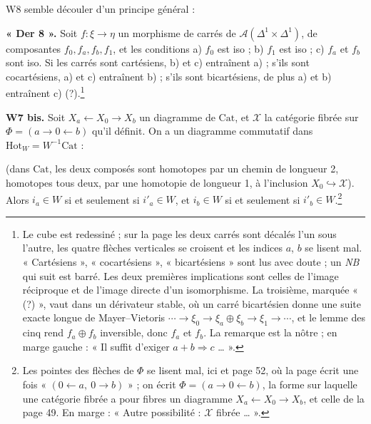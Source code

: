 \documentclass[11pt,a4paper]{article}
\begin{document}
W8 semble découler d'un principe général :

\textbf{« Der 8 ».} Soit $f : \xi \to \eta$ un morphisme de carrés de
$\mathcal{A}(\Delta^1 \times \Delta^1)$, de composantes $f_0, f_a, f_b,
f_1$, et les conditions a) $f_0$ est iso ; b) $f_1$ est iso ; c) $f_a$ et
$f_b$ sont iso. Si les carrés sont cartésiens, b) et c) entraînent a) ; s'ils
sont cocartésiens, a) et c) entraînent b) ; s'ils sont bicartésiens, de plus a)
et b) entraînent c) (?).\footnote{Le cube est redessiné ; sur la page les deux carrés sont décalés
l'un sous l'autre, les quatre flèches verticales se croisent et les indices
$a$, $b$ se lisent mal. « Cartésiens », « cocartésiens », « bicartésiens »
sont lus avec doute ; un \emph{NB} qui suit est barré. Les deux premières
implications sont celles de l'image réciproque et de l'image directe d'un
isomorphisme. La troisième, marquée « (?) », vaut dans un dérivateur stable,
où un carré bicartésien donne une suite exacte longue de Mayer--Vietoris
$\cdots \to \xi_0 \to \xi_a \oplus \xi_b \to \xi_1 \to \cdots$, et le lemme des
cinq rend $f_a \oplus f_b$ inversible, donc $f_a$ et $f_b$. La remarque est la
nôtre ; en marge gauche : « Il suffit d'exiger $a + b \Rightarrow c$ … ».}



\textbf{W7 bis.} Soit $X_a \leftarrow X_0 \rightarrow X_b$ un diagramme de
$\mathrm{Cat}$, et $\mathcal{X}$ la catégorie fibrée sur $\Phi = (a \to 0
\leftarrow b)$ qu'il définit. On a un diagramme commutatif dans
$\mathrm{Hot}_W = W^{-1}\mathrm{Cat}$ :


(dans $\mathrm{Cat}$, les deux composés sont homotopes par un chemin de
longueur 2, homotopes tous deux, par une homotopie de longueur 1, à
l'inclusion $X_0 \hookrightarrow \mathcal{X}$). Alors $i_a \in W$ si et
seulement si $i'_a \in W$, et $i_b \in W$ si et seulement si $i'_b \in
W$.\footnote{Les pointes des flèches de $\Phi$ se lisent mal, ici et page 52,
où la page écrit une fois « $(0 \leftarrow a,\ 0 \to b)$ » ; on écrit
$\Phi = (a \to 0 \leftarrow b)$, la forme sur laquelle une catégorie fibrée
a pour fibres un diagramme $X_a \leftarrow X_0 \rightarrow X_b$, et celle de
la page 49. En marge : « Autre possibilité : $\mathcal{X}$ fibrée … ».}
\end{document}
